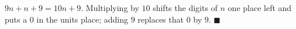 $9n+n+9=10n+9$. Multiplying by $10$ shifts the digits of $n$ one place left and puts a $0$ in the units place; adding $9$ replaces that $0$ by $9$. $\blacksquare$

